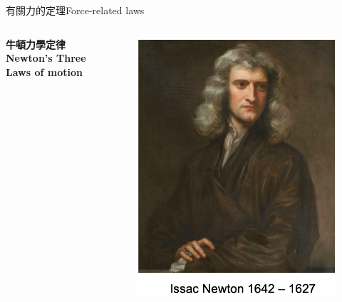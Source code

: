 \documentclass[beamer=true]{standalone}
\begin{document}
\begin{frame}{有關力的定理Force-related laws}
    \begin{columns}
        \begin{center}
            {\LARGE\textbf{牛頓力學定律\\\vspace{1cm}Newton's Three Laws of motion}}
        \end{center}

        \begin{figure}[h!]
            \centering
            \includegraphics[width=.75\textwidth]{assets/57b990b1.png}
        \end{figure}

    \end{columns}
\end{frame}
\end{document}
